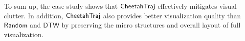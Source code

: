 

To sum up, the case study shows that $\mathsf{CheetahTraj}$ effectively mitigates visual clutter. In addition, $\mathsf{CheetahTraj}$ also provides better visualization quality than $\mathsf{Random}$ and $\mathsf{DTW}$ by preserving the micro structures and overall layout of full visualization.

